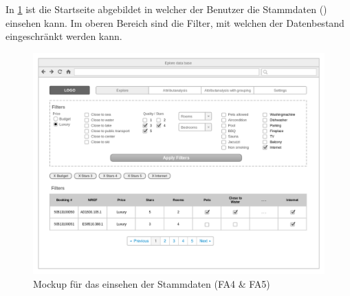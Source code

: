 In \cref{fig:konzept:mockups:stammdaten} ist die Startseite abgebildet in welcher der Benutzer die Stammdaten () einsehen kann. Im oberen Bereich sind die Filter, mit welchen der Datenbestand eingeschränkt werden kann. 
\begin{figure}[H]
	\RawFloats
	\centering
	\includegraphics[width=1\textwidth]{images/wireframe-explore}
	\caption{Mockup für das einsehen der Stammdaten (FA4 \& FA5)}
	\label{fig:konzept:mockups:stammdaten}
\end{figure}

